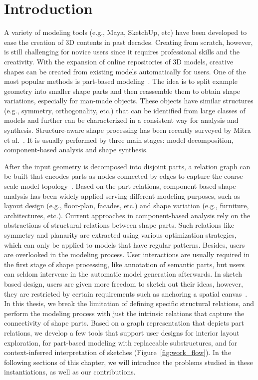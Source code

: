 

\chapter{Introduction}

A variety of modeling tools (e.g., Maya, SketchUp, etc) have been developed to ease the creation of 3D contents in past decades. Creating from scratch, however, is still challenging for novice users since it requires professional skills and the creativity. With the expansion of online repositories of 3D models, creative shapes can be created from existing models automatically for users. One of the most popular methods is part-based modeling~\cite{Funkhouser2004}. The idea is to split example geometry into smaller shape parts and then reassemble them to obtain shape variations, especially for man-made objects. These objects have similar structures (e.g., symmetry, orthogonality, etc.) that can be identified from large classes of models and further can be characterized in a consistent way for analysis and synthesis. Structure-aware shape processing has been recently surveyed by Mitra et al.~\cite{MitraSTAR2013}. It is usually performed by three main stages: model decomposition, component-based analysis and shape synthesis.

After the input geometry is decomposed into disjoint parts, a relation graph can be built that encodes parts as nodes connected by edges to capture the coarse-scale model topology~\cite{Zheng:2013,topoVarying14}. Based on the part relations, component-based shape analysis has been widely applied serving different modeling purposes, such as layout design (e.g., floor-plan, facades, etc.) and shape variation (e.g., furniture, architectures, etc.). Current approaches in component-based analysis rely on the abstractions of structural relations between shape parts. Such relations like symmetry and planarity are extracted using various optimization strategies, which can only be applied to models that have regular patterns. Besides, users are overlooked in the modeling process. User interactions are usually required in the first stage of shape processing, like annotation of semantic parts, but users can seldom intervene in the automatic model generation afterwards. In sketch based design, users are given more freedom to sketch out their ideas, however, they are restricted by certain requirements such as anchoring a spatial canvas~\cite{ilovesketch08}. In this thesis, we break the limitation of defining specific structural relations, and perform the modeling process with just the intrinsic relations that capture the connectivity of shape parts. Based on a graph representation that depicts part relations, we develop a few tools that support user designs for interior layout exploration, for part-based modeling with replaceable substructures, and for context-inferred interpretation of sketches (Figure~\ref{fig:work_flow}). In the following sections of this chapter, we will introduce the problems studied in these instantiations, as well as our contributions.

